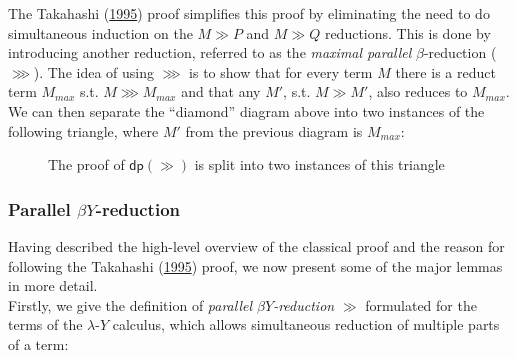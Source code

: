\documentclass[a4paper, 12pt, twoside]{style/ociamthesis}
\theoremstyle{plain}
\theoremstyle{definition}
\theoremstyle{remark}
\newcommand{\lamy}{\lambda\text{-}Y}
\newcommand{\dip}{\textsf{dp}}
\begin{document}
The Takahashi (\protect\hyperlink{ref-takahashi95}{1995}) proof
simplifies this proof by eliminating the need to do simultaneous
induction on the \(M \gg P\) and \(M \gg Q\) reductions. This is done by
introducing another reduction, referred to as the \emph{maximal
parallel} \(\beta\)-reduction (\(\ggg\)). The idea of using \(\ggg\) is
to show that for every term \(M\) there is a reduct term \(M_{max}\)
s.t. \(M \ggg M_{max}\) and that any \(M'\), s.t. \(M \gg M'\), also
reduces to \(M_{max}\). We can then separate the ``diamond'' diagram
above into two instances of the following triangle, where \(M'\) from
the previous diagram is \(M_{max}\):

\begin{figure}
\begin{center}
\end{center}
\caption{The proof of $\dip(\gg)$ is split into two instances of this triangle}
\label{figure:gggTriangle}
\end{figure}

\newpage

\subsubsection{\texorpdfstring{Parallel
\(\beta Y\)-reduction}{Parallel \textbackslash{}beta Y-reduction}}\label{parallel-beta-y-reduction}

Having described the high-level overview of the classical proof and the
reason for following the Takahashi
(\protect\hyperlink{ref-takahashi95}{1995}) proof, we now present some
of the major lemmas in more detail.\\
Firstly, we give the definition of \emph{parallel \(\beta Y\)-reduction}
\(\gg\) formulated for the terms of the \(\lamy\) calculus, which allows
simultaneous reduction of multiple parts of a term: \(\ \)
\end{document}
